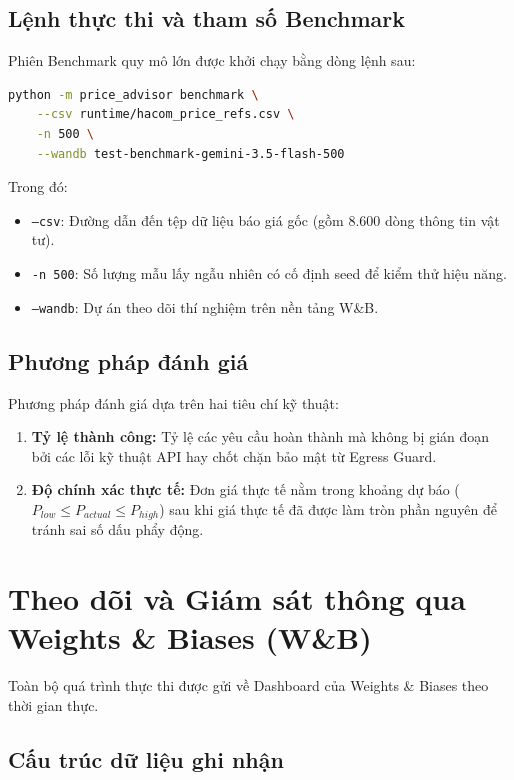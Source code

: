 \subsection{Lệnh thực thi và tham số Benchmark}

Phiên Benchmark quy mô lớn được khởi chạy bằng dòng lệnh sau:
\begin{lstlisting}[language=bash, caption=Lệnh khởi chạy Benchmark 500 mẫu]
python -m price_advisor benchmark \
    --csv runtime/hacom_price_refs.csv \
    -n 500 \
    --wandb test-benchmark-gemini-3.5-flash-500
\end{lstlisting}

Trong đó:
\begin{itemize}
    \item \texttt{--csv}: Đường dẫn đến tệp dữ liệu báo giá gốc (gồm 8.600 dòng thông tin vật tư).
    \item \texttt{-n 500}: Số lượng mẫu lấy ngẫu nhiên có cố định seed để kiểm thử hiệu năng.
    \item \texttt{--wandb}: Dự án theo dõi thí nghiệm trên nền tảng W\&B.
\end{itemize}

\subsection{Phương pháp đánh giá}

Phương pháp đánh giá dựa trên hai tiêu chí kỹ thuật:

\begin{enumerate}
    \item \textbf{Tỷ lệ thành công:} Tỷ lệ các yêu cầu hoàn thành mà không bị gián đoạn bởi các lỗi kỹ thuật API hay chốt chặn bảo mật từ Egress Guard.
    \item \textbf{Độ chính xác thực tế:} Đơn giá thực tế nằm trong khoảng dự báo ($P_{low} \leq P_{actual} \leq P_{high}$) sau khi giá thực tế đã được làm tròn phần nguyên để tránh sai số dấu phẩy động.
\end{enumerate}

\section{Theo dõi và Giám sát thông qua Weights \& Biases (W\&B)}

Toàn bộ quá trình thực thi được gửi về Dashboard của Weights \& Biases theo thời gian thực.

\subsection{Cấu trúc dữ liệu ghi nhận}


